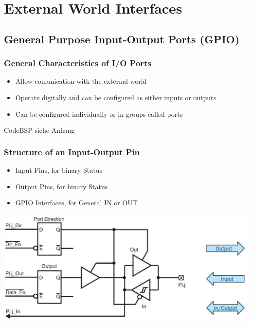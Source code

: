 \section{External World Interfaces }
\subsection{General Purpose Input-Output Ports (GPIO) }
\subsubsection{General Characteristics of I/O Ports}
\begin{itemize}
	\item Allow comunication with the external world
	\item Operate digitally and can be configured as either inputs or outputs
	\item Can be configured individually or in groups called ports
\end{itemize}
CodeBSP siehe Anhang \label{GPIO}
\begin{multicols}{2}
	\subsubsection{Structure of an Input-Output Pin }
	\begin{itemize}
		\item Input Pins, for binary Status
		\item Output Pins, for binary Status
		\item GPIO Interfaces, for General IN or OUT
	\end{itemize}
	
	\includegraphics[width=\linewidth]{images/IOStructure}  
\end{multicols}

